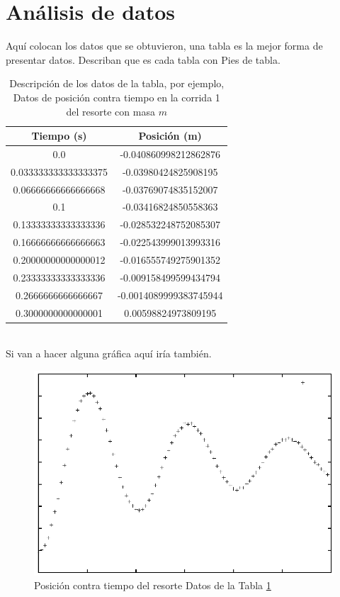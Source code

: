 \documentclass[10pt,letterpaper]{article}
\begin{document}
\section{Análisis de datos}
Aquí colocan los datos que se obtuvieron, una tabla es la mejor forma de presentar datos. Describan que es cada tabla con Pies de tabla.
\begin{table}[ht!]
  \centering
  \begin{tabular}{|c|c|}
  \hline %
  Tiempo (s) & Posición (m) \\
     \hline
     0.0&-0.040860998212862876 \\
0.033333333333333375&-0.03980424825908195\\
0.06666666666666668&-0.03769074835152007\\
0.1&-0.03416824850558363\\
0.13333333333333336&-0.028532248752085307\\
0.16666666666666663&-0.022543999013993316\\
0.20000000000000012&-0.016555749275901352\\
0.23333333333333336&-0.009158499599434794\\
0.2666666666666667&-0.0014089999383745944\\
0.3000000000000001&0.00598824973809195\\
\hline
  \end{tabular}
  \caption{Descripción de los datos de la tabla, por ejemplo, Datos de posición contra tiempo en la corrida 1 del resorte con masa $m$}
  \label{resortito} %
\end{table}
\\
Si van a hacer alguna gráfica aquí iría también.
\\
\begin{figure}[ht!]
    \centering
    \includegraphics[scale=1]{resorte.eps} 
    \caption{Posición contra tiempo del resorte Datos de la Tabla \ref{resortito}} %
    \label{fig:awesome_image}
\end{figure}
\end{document}
